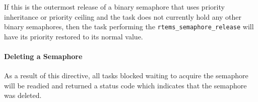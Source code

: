 If this is the outermost release of a binary semaphore
that uses priority inheritance or priority ceiling
and the task does not currently hold any other binary semaphores,
then the task performing the \verb"rtems_semaphore_release"
will have its priority restored to its normal value.

\paragraph{Deleting a Semaphore}

As a result of this directive,
all tasks blocked waiting to acquire the semaphore
will be readied
and returned a status code which indicates that the semaphore was deleted.
